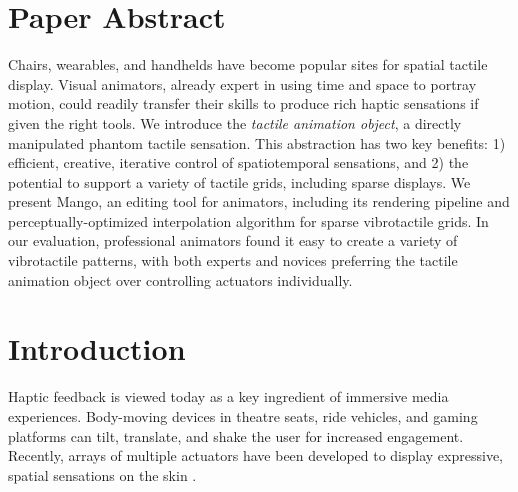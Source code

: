 


\section{Paper Abstract}
Chairs, wearables, and handhelds have become popular sites for spatial tactile display.
Visual animators, 
already expert in using time and space to portray motion, could readily transfer their skills to produce rich haptic sensations if given the right tools.
We introduce the \emph{tactile animation object}, a directly manipulated phantom tactile sensation.
This abstraction has two key benefits: 1) efficient, creative, iterative control of spatiotemporal sensations,
and 2) the potential to support a variety of tactile grids, including sparse displays.
We present Mango, an editing tool for animators, including its rendering pipeline and perceptually-optimized interpolation algorithm for sparse vibrotactile grids.
In our evaluation,
professional animators found it easy to create a variety of
vibrotactile patterns, with both experts and novices preferring the tactile animation object over
controlling actuators individually.

  
%
%
\section{Introduction}

Haptic feedback is
viewed today %
as a key ingredient of immersive media experiences.
Body-moving devices in theatre seats, ride vehicles, and gaming platforms can tilt, translate, and shake the user for increased engagement. 
Recently, arrays of multiple actuators have been developed to display expressive, spatial sensations on the skin 
\cite{Israr2011,Danieau2012a,Sodhi2013,Kim2009,Wilson2014}. 

